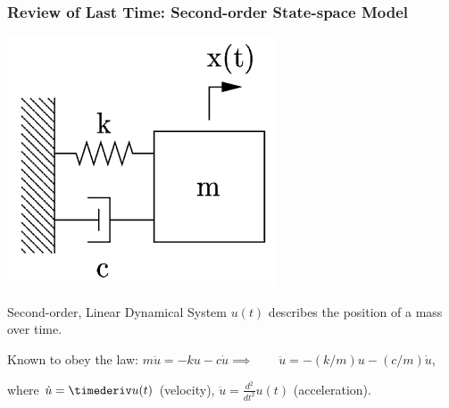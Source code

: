 \documentclass[12pt]{beamer}
\begin{document}
\begin{frame}
\frametitle{Review of Last Time: Second-order State-space Model}

\begin{center}
\includegraphics[width=.3\linewidth]{pic/spring-mass-damper.png}
\end{center}

\begin{block}{Second-order, Linear Dynamical System}
$u(t)$ describes the position of a mass over time.

Known to obey the law:
$m \ddot u = -k u - c \dot u
	\implies\qquad
	\ddot u = -(k/m) u - (c/m) \dot u$,
	
where $\dot u = \timederiv u(t)$ (velocity), $\ddot u = \frac{d^2}{dt^2} u(t)$ (acceleration).
\end{block}

\end{frame}
\end{document}
